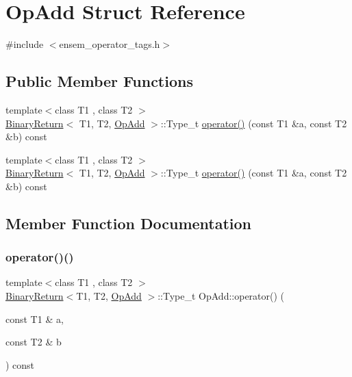 \hypertarget{structOpAdd}{}\section{Op\+Add Struct Reference}
\label{structOpAdd}


{\ttfamily \#include $<$ensem\+\_\+operator\+\_\+tags.\+h$>$}

\subsection*{Public Member Functions}
\begin{DoxyCompactItemize}
\item 
{\footnotesize template$<$class T1 , class T2 $>$ }\\\mbox{\hyperlink{structBinaryReturn}{Binary\+Return}}$<$ T1, T2, \mbox{\hyperlink{structOpAdd}{Op\+Add}} $>$\+::Type\+\_\+t \mbox{\hyperlink{structOpAdd_a1eeb43f9d50d80994b1d2fe141bca73b}{operator()}} (const T1 \&a, const T2 \&b) const
\item 
{\footnotesize template$<$class T1 , class T2 $>$ }\\\mbox{\hyperlink{structBinaryReturn}{Binary\+Return}}$<$ T1, T2, \mbox{\hyperlink{structOpAdd}{Op\+Add}} $>$\+::Type\+\_\+t \mbox{\hyperlink{structOpAdd_a1eeb43f9d50d80994b1d2fe141bca73b}{operator()}} (const T1 \&a, const T2 \&b) const
\end{DoxyCompactItemize}


\subsection{Member Function Documentation}
\mbox{\label{structOpAdd_a1eeb43f9d50d80994b1d2fe141bca73b}} 
\subsubsection{\texorpdfstring{operator()()}{operator()()}\hspace{0.1cm}{\footnotesize\ttfamily [1/2]}}
{\footnotesize\ttfamily template$<$class T1 , class T2 $>$ \\
\mbox{\hyperlink{structBinaryReturn}{Binary\+Return}}$<$T1, T2, \mbox{\hyperlink{structOpAdd}{Op\+Add}} $>$\+::Type\+\_\+t Op\+Add\+::operator() (\begin{DoxyParamCaption}\item[{const T1 \&}]{a,  }\item[{const T2 \&}]{b }\end{DoxyParamCaption}) const\hspace{0.3cm}{\ttfamily [inline]}}

